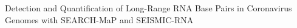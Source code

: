 \documentclass[12pt,a4paper]{article}
\begin{document}
\sloppy

Detection and Quantification of Long-Range RNA Base Pairs in Coronavirus Genomes with SEARCH-MaP and SEISMIC-RNA







\begin{singlespace}
	
	
\end{singlespace}
\end{document}
